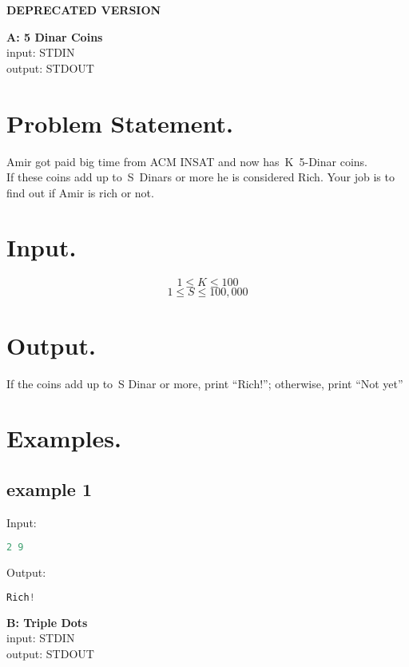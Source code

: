 \documentclass[10pt]{article}
\begin{document}
    \Huge { \textbf{DEPRECATED VERSION}} \\ 

\begin{center}
    \Huge { \textbf{A: 5 Dinar Coins}} \\ 
    \normalsize  { input:  STDIN}\\
    \normalsize{    output: STDOUT}
\end{center}
\section{Problem Statement.}
Amir got paid big time from ACM INSAT and now has K 5-Dinar coins.\\
If these coins add up to S Dinars or more he is considered Rich. Your job is to find out if Amir is rich or not.
\paragraph{}
\section{Input.}
$$ 1\le K \le 100 $$
$$ 1\le S \le 100,000 $$
\section{Output.}

If the coins add up to S Dinar or more, print “Rich!”; otherwise, print “Not yet”

\section{Examples.}
\subsection{example 1}
Input:
\begin{lstlisting}[language=Python]
2 9
\end{lstlisting}
Output:
\begin{lstlisting}[language=Python]
Rich!
\end{lstlisting}
\newpage
\begin{center}
    \Huge { \textbf{B: Triple Dots}}\\
    \normalsize  { input:  STDIN}\\
    \normalsize{    output: STDOUT}

\end{center}
\end{document}
